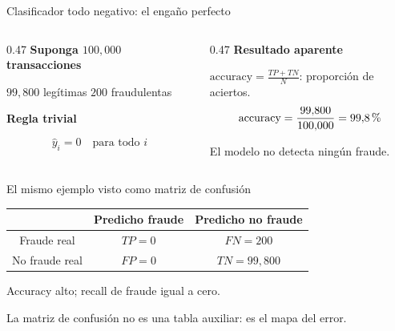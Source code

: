 \documentclass[aspectratio=169,12pt]{beamer}
\newcommand{\colhead}[1]{\textbf{#1}\par\vspace{2pt}}
\newcommand{\hrow}{\rowcolor{mlcream}}
\begin{document}
\begin{frame}{Clasificador todo negativo: el engaño perfecto}
  \small
  \begin{columns}[T]
    \begin{column}{0.47\textwidth}
      \colhead{Suponga $100{,}000$ transacciones}
      \vspace{4pt}
      \hspace{1em}$99{,}800$ legítimas \hfill $200$ fraudulentas\hspace*{1em}
      \vspace{10pt}

      \colhead{Regla trivial}
      \[ \hat{y}_i = 0 \quad \text{para todo } i \]
    \end{column}
    \begin{column}{0.47\textwidth}
      \colhead{Resultado aparente}
      {\footnotesize $\text{accuracy} = \frac{TP + TN}{N}$: proporción de aciertos.}
      \[ \text{accuracy} = \frac{99{,}800}{100{,}000} = 99{,}8\text{\,\%} \]
      \vspace{4pt}
      \begin{rulebox}
        El modelo no detecta ningún fraude.
      \end{rulebox}
    \end{column}
  \end{columns}
\end{frame}

\begin{frame}{El mismo ejemplo visto como matriz de confusión}
  \centering
  \begin{tabular}{ccc}
    \toprule
    \hrow & Predicho fraude & Predicho no fraude \\
    \midrule
    Fraude real & $TP = 0$ & $FN = 200$ \\
    No fraude real & $FP = 0$ & $TN = 99{,}800$ \\
    \bottomrule
  \end{tabular}
  \vspace{14pt}

  \small Accuracy alto; recall de fraude igual a cero.
  \vspace{14pt}

  \large La matriz de confusión no es una tabla auxiliar: es el mapa del error.
\end{frame}

\end{document}
